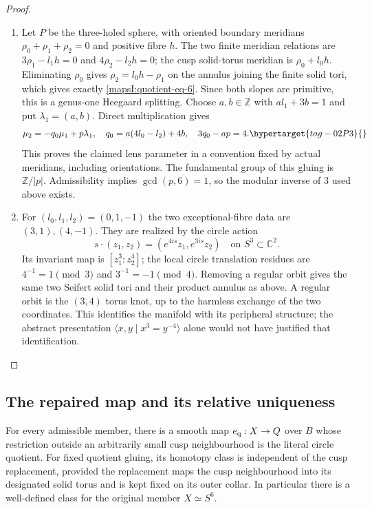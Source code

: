 \begin{proof}
\begin{enumerate}[label=\arabic*.,leftmargin=*]
\item Let $P$ be the three-holed sphere, with oriented boundary
meridians $\rho_0+\rho_1+\rho_2=0$ and positive fibre $h$.
The two finite meridian relations are
$3\rho_1-l_1h=0$ and $4\rho_2-l_2h=0$; the cusp solid-torus
meridian is $\rho_0+l_0h$.  Eliminating $\rho_0$ gives
$\rho_2=l_0h-\rho_1$ on the annulus joining the finite solid
tori, which gives exactly \eqref{mapsI:quotient-eq-6}.  Since both slopes are
primitive, this is a genus-one Heegaard splitting.  Choose
$a,b\in\mathbb Z$ with $al_1+3b=1$ and put
$\lambda_1=(a,b)$.  Direct multiplication gives
\[
 \mu_2=-q_0\mu_1+p\lambda_1,
 \quad q_0=a(4l_0-l_2)+4b,
 \quad 3q_0-ap=4.
 \hypertarget{tag-02P3}{}\label{mapsI:quotient-eq-7}
\]
This proves the claimed lens parameter in a convention fixed
by actual meridians, including orientations.  The fundamental
group of this gluing is $\mathbb Z/|p|$.  Admissibility implies
$\gcd(p,6)=1$, so the modular inverse of $3$ used above exists.

\item For $(l_0,l_1,l_2)=(0,1,-1)$ the two exceptional-fibre data
are $(3,1),(4,-1)$.  They are realized by the circle action
\[
 s\cdot(z_1,z_2)=(e^{4is}z_1,e^{3is}z_2)
 \quad\text{on } S^3\subset\mathbb C^2.
\]
Its invariant map is $[z_1^3:z_2^4]$; the local circle
translation residues are $4^{-1}=1\pmod3$ and
$3^{-1}=-1\pmod4$.  Removing a regular orbit gives the
same two Seifert solid tori and their product annulus as
above.  A regular orbit is the $(3,4)$ torus knot, up to
the harmless exchange of the two coordinates.  This
identifies the manifold with its peripheral structure;
the abstract presentation $\langle x,y\mid x^3=y^{-4}\rangle$
alone would not have justified that identification.
\end{enumerate}
\end{proof}

\subsection{The repaired map and its relative uniqueness}

\begin{theorem}\hypertarget{tag-02PD}{}\label{mapsI:src:A.2.1}

For every admissible member, there is a smooth map
$e_{\rm q}:X\to Q$ over $B$ whose restriction outside an arbitrarily
small cusp neighbourhood is the literal circle quotient.
For fixed quotient gluing, its homotopy class is independent
of the cusp replacement, provided the replacement maps the
cusp neighbourhood into its designated solid torus and is
kept fixed on its outer collar.  In particular there is a
well-defined class for the original member $X\simeq S^6$.
\end{theorem}




